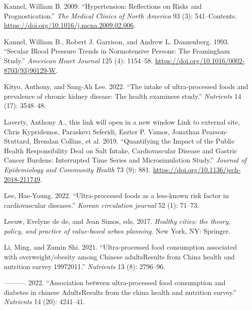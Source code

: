 \documentclass[
]{article}
\newlength{\cslhangindent}
\newlength{\cslentryspacingunit} %
\newenvironment{CSLReferences}[2] %
 {%
  \setlength{\parindent}{0pt}
  \ifodd #1
  \let\oldpar\par
  \def\par{\hangindent=\cslhangindent\oldpar}
  \fi
  \setlength{\parskip}{#2\cslentryspacingunit}
 }%
 {}
\begin{document}
\begin{CSLReferences}{1}{0}
\leavevmode{}%
Kannel, William B. 2009. {``Hypertension: Reflections on Risks and
Prognostication.''} \emph{The Medical Clinics of North America} 93 (3):
541--Contents. \url{https://doi.org/10.1016/j.mcna.2009.02.006}.

\leavevmode{}%
Kannel, William B., Robert J. Garrison, and Andrew L. Dannenberg. 1993.
{``Secular Blood Pressure Trends in Normotensive Persons: The Framingham
Study.''} \emph{American Heart Journal} 125 (4): 1154--58.
\url{https://doi.org/10.1016/0002-8703(93)90129-W}.

\leavevmode{}%
Kityo, Anthony, and Sang-Ah Lee. 2022. {``The intake of ultra-processed
foods and prevalence of chronic kidney disease: The health examinees
study.''} \emph{Nutrients} 14 (17): 3548--48.

\leavevmode{}%
Laverty, Anthony A., this link will open in a new window Link to
external site, Chris Kypridemos, Paraskevi Seferidi, Eszter P. Vamos,
Jonathan Pearson-Stuttard, Brendan Collins, et al. 2019. {``Quantifying
the Impact of the Public Health Responsibility Deal on Salt Intake,
Cardiovascular Disease and Gastric Cancer Burdens: Interrupted Time
Series and Microsimulation Study.''} \emph{Journal of Epidemiology and
Community Health} 73 (9): 881.
\url{https://doi.org/10.1136/jech-2018-211749}.

\leavevmode{}%
Lee, Hae-Young. 2022. {``Ultra-processed foods as a less-known risk
factor in cardiovascular diseases.''} \emph{Korean circulation journal}
52 (1): 71--73.

\leavevmode{}%
Leeuw, Evelyne de de, and Jean Simos, eds. 2017. \emph{Healthy cities:
the theory, policy, and practice of value-based urban planning}. New
York, NY: Springer.

\leavevmode{}%
Li, Ming, and Zumin Shi. 2021. {``Ultra-processed food consumption
associated with overweight/obesity among Chinese
adults{\textemdash}Results from China health and nutrition survey
1997{\textendash}2011.''} \emph{Nutrients} 13 (8): 2796--96.

\leavevmode{}%
---------. 2022. {``Association between ultra-processed food consumption
and diabetes in chinese Adults{\textemdash}Results from the china health
and nutrition survey.''} \emph{Nutrients} 14 (20): 4241--41.


\end{CSLReferences}
\end{document}
